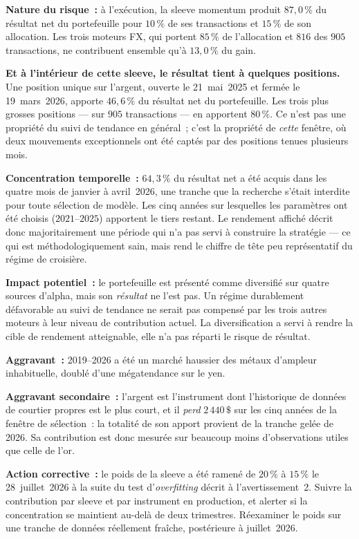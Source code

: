 \begin{warningbox}
\textbf{Nature du risque~:} à l'exécution, la sleeve momentum produit $87{,}0\,\%$ du résultat net du portefeuille pour $10\,\%$ de ses transactions et $15\,\%$ de son allocation. Les trois moteurs FX, qui portent $85\,\%$ de l'allocation et $816$ des $905$ transactions, ne contribuent ensemble qu'à $13{,}0\,\%$ du gain.

\textbf{Et à l'intérieur de cette sleeve, le résultat tient à quelques positions.} Une position unique sur l'argent, ouverte le 21~mai~2025 et fermée le 19~mars~2026, apporte $46{,}6\,\%$ du résultat net du portefeuille. Les trois plus grosses positions --- sur $905$ transactions --- en apportent $80\,\%$. Ce n'est pas une propriété du suivi de tendance en général~; c'est la propriété de \emph{cette} fenêtre, où deux mouvements exceptionnels ont été captés par des positions tenues plusieurs mois.

\textbf{Concentration temporelle~:} $64{,}3\,\%$ du résultat net a été acquis dans les quatre mois de janvier à avril~2026, une tranche que la recherche s'était interdite pour toute sélection de modèle. Les cinq années sur lesquelles les paramètres ont été choisis ($2021$--$2025$) apportent le tiers restant. Le rendement affiché décrit donc majoritairement une période qui n'a pas servi à construire la stratégie --- ce qui est méthodologiquement sain, mais rend le chiffre de tête peu représentatif du régime de croisière.

\textbf{Impact potentiel~:} le portefeuille est présenté comme diversifié sur quatre sources d'alpha, mais son \emph{résultat} ne l'est pas. Un régime durablement défavorable au suivi de tendance ne serait pas compensé par les trois autres moteurs à leur niveau de contribution actuel. La diversification a servi à rendre la cible de rendement atteignable, elle n'a pas réparti le risque de résultat.

\textbf{Aggravant~:} 2019--2026 a été un marché haussier des métaux d'ampleur inhabituelle, doublé d'une mégatendance sur le yen.

\textbf{Aggravant secondaire~:} l'argent est l'instrument dont l'historique de données de courtier propres est le plus court, et il \emph{perd} $2\,440\,\$$ sur les cinq années de la fenêtre de sélection~: la totalité de son apport provient de la tranche gelée de 2026. Sa contribution est donc mesurée sur beaucoup moins d'observations utiles que celle de l'or.

\textbf{Action corrective~:} le poids de la sleeve a été ramené de $20\,\%$ à $15\,\%$ le 28~juillet~2026 à la suite du test d'\textit{overfitting} décrit à l'avertissement~2. Suivre la contribution par sleeve et par instrument en production, et alerter si la concentration se maintient au-delà de deux trimestres. Réexaminer le poids sur une tranche de données réellement fraîche, postérieure à juillet~2026.
\end{warningbox}


